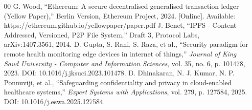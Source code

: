 \documentclass[conference]{IEEEtran}
\begin{document}
\begin{thebibliography}{00}
 G. Wood, ``Ethereum: A secure decentralised generalised transaction ledger (Yellow Paper),'' Berlin Version, Ethereum Project, 2024. [Online]. Available: https://ethereum.github.io/yellowpaper/paper.pdf
 J. Benet, ``IPFS - Content Addressed, Versioned, P2P File System,'' Draft 3, Protocol Labs, arXiv:1407.3561, 2014.
 D. Gupta, S. Rani, S. Raza, et al., ``Security paradigm for remote health monitoring edge devices in internet of things,'' \textit{Journal of King Saud University - Computer and Information Sciences}, vol. 35, no. 6, p. 101478, 2023. DOI: 10.1016/j.jksuci.2023.101478.
 D. Dhinakaran, N. J. Kumar, N. P. Ponnuviji, et al., ``Safeguarding confidentiality and privacy in cloud-enabled healthcare systems,'' \textit{Expert Systems with Applications}, vol. 279, p. 127584, 2025. DOI: 10.1016/j.eswa.2025.127584.
\end{thebibliography}
\end{document}
